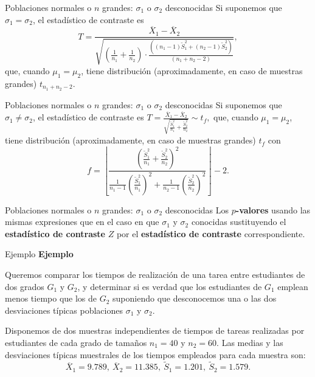 \documentclass[
  ignorenonframetext,
]{beamer}
\begin{document}
\begin{frame}{Poblaciones normales o \(n\) grandes: \(\sigma_1\) o
\(\sigma_2\) desconocidas}
\protect\hypertarget{poblaciones-normales-o-n-grandes-sigma_1-o-sigma_2-desconocidas-2}{}
Si suponemos que \(\sigma_1=\sigma_2\), el estadístico de contraste es
\[
T=\frac{\overline{X}_1-\overline{X}_2}
{\sqrt{(\frac1{n_1}+\frac1{n_2})\cdot 
\frac{((n_1-1)\widetilde{S}_1^2+(n_2-1)\widetilde{S}_2^2)}
{(n_1+n_2-2)}}},
\] que, cuando \(\mu_1=\mu_2\), tiene distribución (aproximadamente, en
caso de muestras grandes) \(t_{n_1+n_2-2}\).
\end{frame}

\begin{frame}{Poblaciones normales o \(n\) grandes: \(\sigma_1\) o
\(\sigma_2\) desconocidas}
\protect\hypertarget{poblaciones-normales-o-n-grandes-sigma_1-o-sigma_2-desconocidas-3}{}
Si suponemos que \(\sigma_1\neq \sigma_2\), el estadístico de contraste
es
\(T=\frac{\overline{X}_1-\overline{X}_2}{\sqrt{\frac{\widetilde{S}_1^2}{n_1}+\frac{\widetilde{S}_2^2}{n_2}}}\sim t_f,\)
que, cuando \(\mu_1=\mu_2\), tiene distribución (aproximadamente, en
caso de muestras grandes) \(t_{f}\) con \[
f=\left\lfloor\frac{\displaystyle \left( \frac{\widetilde{S}_1^2}{n_1}+\frac{\widetilde{S}_2^2}{n_2}\right)^2}
{\displaystyle \frac1{n_1-1}\left(\frac{\widetilde{S}_1^2}{n_1}\right)^2+\frac1{n_2-1}\left(\frac{\widetilde{S}_2^2}{n_2}\right)^2}\right\rfloor -2.
\]
\end{frame}

\begin{frame}{Poblaciones normales o \(n\) grandes: \(\sigma_1\) o
\(\sigma_2\) desconocidas}
\protect\hypertarget{poblaciones-normales-o-n-grandes-sigma_1-o-sigma_2-desconocidas-4}{}
Los \textbf{\(p\)-valores} usando las mismas expresiones que en el caso
en que \(\sigma_1\) y \(\sigma_2\) conocidas sustituyendo el
\textbf{estadístico de contraste} \(Z\) por el \textbf{estadístico de
contraste} correspondiente.
\end{frame}

\begin{frame}{Ejemplo}
\protect\hypertarget{ejemplo-25}{}
\textbf{Ejemplo}

Queremos comparar los tiempos de realización de una tarea entre
estudiantes de dos grados \(G_1\) y \(G_2\), y determinar si es verdad
que los estudiantes de \(G_1\) emplean menos tiempo que los de \(G_2\)
suponiendo que desconocemos una o las dos desviaciones típicas
poblaciones \(\sigma_1\) y \(\sigma_2\).

Disponemos de dos muestras independientes de tiempos de tareas
realizadas por estudiantes de cada grado de tamaños \(n_1=40\) y
\(n_2=60\). Las medias y las desviaciones típicas muestrales de los
tiempos empleados para cada muestra son: \[
\overline{X}_1= 9.789,\  \overline{X}_2=11.385,\ 
\widetilde{S}_1=1.201,\  \widetilde{S}_2=1.579.
\]
\end{frame}
\end{document}

